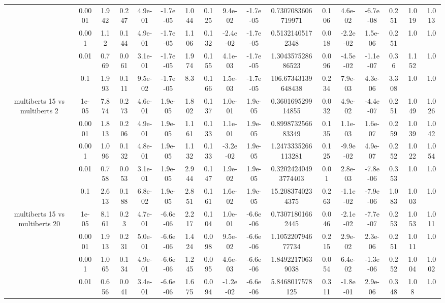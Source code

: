 \begin{tabular}{|c|c|c|c|c|c|c|c|c|c|c|c|c|c|c|c|c|}
 & 0.0001 & 1.942 & 0.247 & 4.9e-01 & -1.7e-05 & 1.044 & 0.125 & 9.4e-02 & -1.7e-05 & 0.7307083606719971 & 0.106 & 4.6e-02 & -6.7e-08 & 0.251 & 1.019 & 1.013 \\
 & 0.001 & 1.12 & 0.144 & 4.9e-01 & -1.7e-05 & 1.106 & 0.132 & -2.4e-02 & -1.7e-05 & 0.51321405172348 & 0.018 & -2.2e-02 & 1.5e-06 & 0.251 & 1.0 & 1.0 \\
 & 0.01 & 0.769 & 0.061 & 3.1e-01 & -1.7e-05 & 1.974 & 0.155 & 4.1e-03 & -1.7e-05 & 1.304357528686523 & 0.096 & -4.5e-02 & -1.1e-07 & 0.36 & 1.152 & 1.0 \\
 & 0.1 & 1.993 & 0.111 & 9.5e-02 & -1.7e-05 & 8.3 & 0.166 & 1.5e-03 & -1.7e-05 & 106.67343139648438 & 0.234 & 7.9e-03 & 4.3e-06 & 3.308 & 1.0 & 1.0 \\
\hline
\multirow{5}{*}{multiberts 15 vs multiberts 2} & 1e-05 & 7.874 & 0.273 & 4.6e-01 & 1.9e-05 & 1.802 & 0.137 & 1.0e-01 & 1.9e-05 & 0.360169529914855 & 0.032 & 4.9e-02 & -4.4e-07 & 0.251 & 1.049 & 1.026 \\
 & 0.0001 & 1.813 & 0.206 & 4.9e-01 & 1.9e-05 & 1.161 & 0.133 & 1.1e-01 & 1.9e-05 & 0.899873256683349 & 0.135 & 1.1e-03 & 1.6e-07 & 0.259 & 1.039 & 1.042 \\
 & 0.001 & 1.096 & 0.132 & 4.8e-01 & 1.9e-05 & 1.132 & 0.133 & -3.2e-02 & 1.9e-05 & 1.2473335266113281 & 0.125 & -9.9e-02 & 4.9e-07 & 0.252 & 1.022 & 1.054 \\
 & 0.01 & 0.758 & 0.053 & 3.1e-01 & 1.9e-05 & 2.944 & 0.147 & 1.9e-02 & 1.9e-05 & 0.32024240493774403 & 0.01 & 2.8e-03 & -7.8e-06 & 0.353 & 1.0 & 1.0 \\
 & 0.1 & 2.613 & 0.188 & 6.8e-02 & 1.9e-05 & 2.851 & 0.161 & 1.6e-02 & 1.9e-05 & 15.2083740234375 & 0.263 & -1.1e-02 & -7.9e-06 & 1.083 & 1.003 & 1.0 \\
\hline
\multirow{5}{*}{multiberts 15 vs multiberts 20} & 1e-05 & 8.161 & 0.23 & 4.7e-01 & -6.6e-06 & 2.217 & 0.104 & 1.0e-01 & -6.6e-06 & 0.73071801662445 & 0.046 & -2.1e-02 & -7.7e-07 & 0.253 & 1.053 & 1.011 \\
 & 0.0001 & 1.913 & 0.231 & 5.0e-01 & -6.6e-06 & 1.424 & 0.098 & 9.5e-02 & -6.6e-06 & 1.105220794677734 & 0.215 & 2.9e-02 & 2.3e-06 & 0.251 & 1.011 & 1.0 \\
 & 0.001 & 1.065 & 0.134 & 4.9e-01 & -6.6e-06 & 1.245 & 0.095 & 4.6e-03 & -6.6e-06 & 1.84922170639038 & 0.054 & 6.4e-02 & -1.3e-06 & 0.252 & 1.004 & 1.002 \\
 & 0.01 & 0.656 & 0.041 & 3.4e-01 & -6.6e-06 & 1.675 & 0.094 & -1.2e-02 & -6.6e-06 & 5.8468017578125 & 0.311 & -1.8e-01 & 2.9e-06 & 0.348 & 1.08 & 1.0 \\

\end{tabular}
